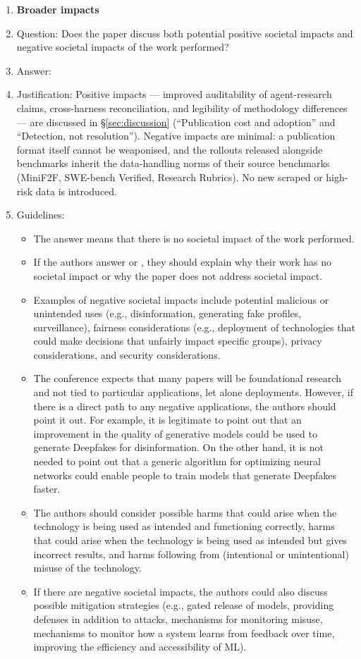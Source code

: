 \begin{enumerate}
\item {\bf Broader impacts}
    \item[] Question: Does the paper discuss both potential positive societal impacts and negative societal impacts of the work performed?
    \item[] Answer: \answerYes{}
    \item[] Justification: Positive impacts --- improved auditability of agent-research claims, cross-harness reconciliation, and legibility of methodology differences --- are discussed in \S\ref{sec:discussion} (``Publication cost and adoption'' and ``Detection, not resolution''). Negative impacts are minimal: a publication format itself cannot be weaponised, and the rollouts released alongside benchmarks inherit the data-handling norms of their source benchmarks (MiniF2F, SWE-bench Verified, Research Rubrics). No new scraped or high-risk data is introduced.
    \item[] Guidelines:
    \begin{itemize}
        \item The answer \answerNA{} means that there is no societal impact of the work performed.
        \item If the authors answer \answerNA{} or \answerNo, they should explain why their work has no societal impact or why the paper does not address societal impact.
        \item Examples of negative societal impacts include potential malicious or unintended uses (e.g., disinformation, generating fake profiles, surveillance), fairness considerations (e.g., deployment of technologies that could make decisions that unfairly impact specific groups), privacy considerations, and security considerations.
        \item The conference expects that many papers will be foundational research and not tied to particular applications, let alone deployments. However, if there is a direct path to any negative applications, the authors should point it out. For example, it is legitimate to point out that an improvement in the quality of generative models could be used to generate Deepfakes for disinformation. On the other hand, it is not needed to point out that a generic algorithm for optimizing neural networks could enable people to train models that generate Deepfakes faster.
        \item The authors should consider possible harms that could arise when the technology is being used as intended and functioning correctly, harms that could arise when the technology is being used as intended but gives incorrect results, and harms following from (intentional or unintentional) misuse of the technology.
        \item If there are negative societal impacts, the authors could also discuss possible mitigation strategies (e.g., gated release of models, providing defenses in addition to attacks, mechanisms for monitoring misuse, mechanisms to monitor how a system learns from feedback over time, improving the efficiency and accessibility of ML).
    \end{itemize}


\end{enumerate}
